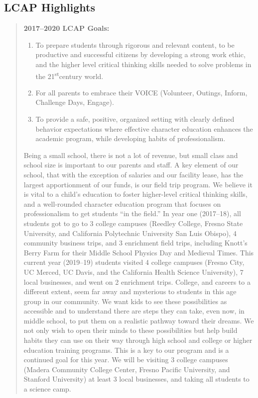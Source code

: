 \documentclass{article}
\newcommand{\st}{\textsuperscript{st}}
\newcounter{goal}[section] %
\begin{document}
\subsection{LCAP Highlights}
\begin{quotation}
	{\bf 2017--2020 LCAP Goals:}
	\begin{enumerate}
		\item To prepare students through rigorous and relevant content, to be productive and successful citizens by developing a strong work ethic, and the higher level critical thinking skills needed to solve problems in the 21\st century world.
		\item For all parents to embrace their VOICE (Volunteer, Outings, Inform, Challenge Days, Engage).
		\item To provide a safe, positive, organized setting with clearly defined behavior expectations where effective character education enhances the academic program, while developing habits of professionalism.
	\end{enumerate}
	
	Being a small school, there is not a lot of revenue, but small class and school size is important to our parents and staff. A key element of our school, that with the exception of salaries and our facility lease, has the largest apportionment of our funds, is our field trip program. We believe it is vital to a child's education to foster higher-level critical thinking skills, and a well-rounded character education program that focuses on professionalism to get students ``in the field.'' In year one (2017--18), all students got to go to 3 college campuses (Reedley College, Fresno State University, and California Polytechnic University San Luis Obispo), 4 community business trips, and 3 enrichment field trips, including Knott's Berry Farm for their Middle School Physics Day and Medieval Times. This current year (2019--19) students visited 4 college campuses (Fresno City, UC Merced, UC Davis, and the California Health Science University), 7 local businesses, and went on 2 enrichment trips. College, and careers to a different extent, seem far away and mysterious to students in this age group in our community. We want kids to see these possibilities as accessible and to understand there are steps they can take, even now, in middle school, to put them on a realistic pathway toward their dreams. We not only wish to open their minds to these possibilities but help build habits they can use on their way through high school and college or higher education training programs. This is a key to our program and is a continued goal for this year. We will be visiting 3 college campuses (Madera Community College Center, Fresno Pacific University, and Stanford University) at least 3 local businesses, and taking all students to a science camp.
\end{quotation}
\end{document}
